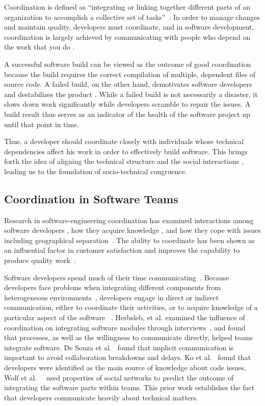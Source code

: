 Coordination is defined as ``integrating or linking together different parts of an organization to accomplish a collective set of tasks''~\cite{vandeven1976}. In order to manage changes and maintain quality, developers must coordinate, and in software development, coordination is largely achieved by communicating with people who depend on the work that you do \cite{kraut:1995coordination}.

A successful software build can be viewed as the outcome of good coordination because the build requires the correct compilation of multiple, dependent files of source code.
A failed build, on the other hand, demotivates software developers \cite{holck2004,damian:icgse:2007} and destabilizes the product \cite{cusumano1997}.
While a failed build is not necessarily a disaster, it slows down work significantly while developers scramble to repair the issues.
A build result thus serves as an indicator of the health of the software project up until that point in time.

Thus, a developer should coordinate closely with individuals whose technical dependencies affect his work in order to effectively build software. This brings forth the idea of aligning the technical structure and the social interactions \cite{herbsleb2007:fose}, leading us to the foundation of socio-technical congruence.

\subsection{Coordination in Software Teams}
Research in software-engineering coordination has examined interactions among
software developers \cite{carter2004,marczak:re:2008}, how they acquire
knowledge \cite{ehrlich:icgse:2006,nakakoji2010:rdc}, and
how they cope with issues including geographical
separation~\cite{espinosa2007:team_knowledge,herbsleb2003:speed}.
The ability to coordinate has
been shown as an influential factor in customer satisfaction \cite{kraut:1995coordination} and  improves the capability to produce quality work~\cite{faraj2000}.


Software developers spend much of their time
communicating~\cite{perry94}. Because developers face
problems when integrating different components from heterogeneous environments~\cite{redmiles2007:continuous},
developers engage in direct or indirect
communication, either to coordinate their activities, or to acquire knowledge of
a particular aspect of the software ~\cite{nakakoji2010:rdc}.
Herbsleb, et al. examined the influence of coordination on integrating software
modules through interviews~\cite{herbsleb1999:architectures}, and found that
processes, as well as the willingness to communicate directly, helped teams
integrate software. De Souza et al.~\cite{desouza2007:awarenessnetwork} found that implicit
communication is important to avoid collaboration breakdowns and delays. Ko et al.~\cite{ko:icse:2007} found that developers were identified as the main source of knowledge about code issues.
Wolf et al.~~\cite{wolf:icse:2009} used properties of social networks to predict the outcome of integrating the software parts within teams.
This prior work establishes the fact that developers communicate heavily about technical matters.

